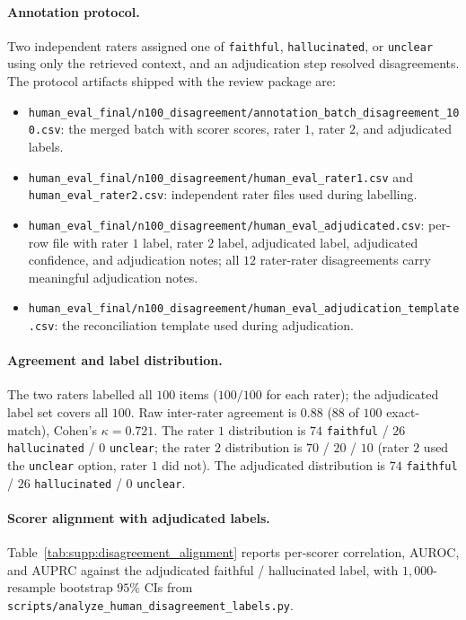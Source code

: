 \documentclass[11pt]{article}
\begin{document}
\paragraph{Annotation protocol.} Two independent raters assigned one
of \texttt{faithful}, \texttt{hallucinated}, or \texttt{unclear} using
only the retrieved context, and an adjudication step resolved
disagreements. The protocol artifacts shipped with the review package
are:
\begin{itemize}
    \item \texttt{human\_eval\_final/n100\_disagreement/annotation\_batch\_disagreement\_100.csv}: the merged batch with scorer scores, rater $1$, rater $2$, and adjudicated labels.
    \item \texttt{human\_eval\_final/n100\_disagreement/human\_eval\_rater1.csv} and \texttt{human\_eval\_rater2.csv}: independent rater files used during labelling.
    \item \texttt{human\_eval\_final/n100\_disagreement/human\_eval\_adjudicated.csv}: per-row file with rater $1$ label, rater $2$ label, adjudicated label, adjudicated confidence, and adjudication notes; all $12$ rater-rater disagreements carry meaningful adjudication notes.
    \item \texttt{human\_eval\_final/n100\_disagreement/human\_eval\_adjudication\_template.csv}: the reconciliation template used during adjudication.
\end{itemize}

\paragraph{Agreement and label distribution.}
The two raters labelled all $100$ items
($100/100$ for each rater); the adjudicated label set covers all
$100$. Raw inter-rater agreement is $0.88$ ($88$ of $100$
exact-match), Cohen's $\kappa=0.721$. The rater $1$ distribution is
$74$ \texttt{faithful} / $26$ \texttt{hallucinated} / $0$
\texttt{unclear}; the rater $2$ distribution is $70$ /
$20$ / $10$ (rater $2$ used the \texttt{unclear} option, rater $1$
did not). The adjudicated distribution is
$74$ \texttt{faithful} / $26$ \texttt{hallucinated} / $0$
\texttt{unclear}.

\paragraph{Scorer alignment with adjudicated labels.}
Table~\ref{tab:supp:disagreement_alignment} reports per-scorer
correlation, AUROC, and AUPRC against the adjudicated faithful /
hallucinated label, with $1{,}000$-resample bootstrap $95\%$ CIs from
\texttt{scripts/analyze\_human\_disagreement\_labels.py}.
\end{document}
